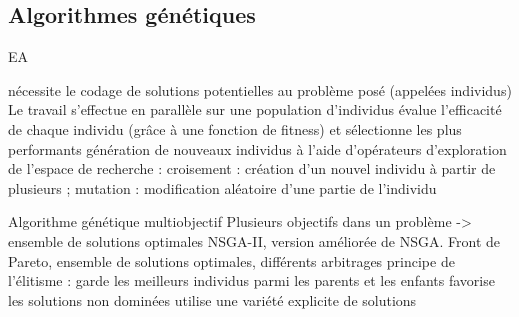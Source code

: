 \documentclass{llncs}
\begin{document}
\subsection{Algorithmes génétiques}

EA

nécessite le codage de solutions potentielles au problème posé (appelées individus)
Le travail s'effectue en parallèle sur une population d’individus
évalue l’efficacité de chaque individu (grâce à une fonction de fitness) et sélectionne les plus performants
génération de nouveaux individus à l’aide d’opérateurs d’exploration de l’espace de recherche : croisement : création d’un nouvel individu à partir de plusieurs ; mutation : modification aléatoire d’une partie de l’individu


Algorithme génétique multiobjectif
Plusieurs objectifs dans un problème -> ensemble de solutions optimales
NSGA-II, version améliorée de NSGA.
Front de Pareto, ensemble de solutions optimales, différents arbitrages
principe de l'élitisme : garde les meilleurs individus parmi les parents et les enfants
favorise les solutions non dominées
utilise une variété explicite de solutions






\end{document}
